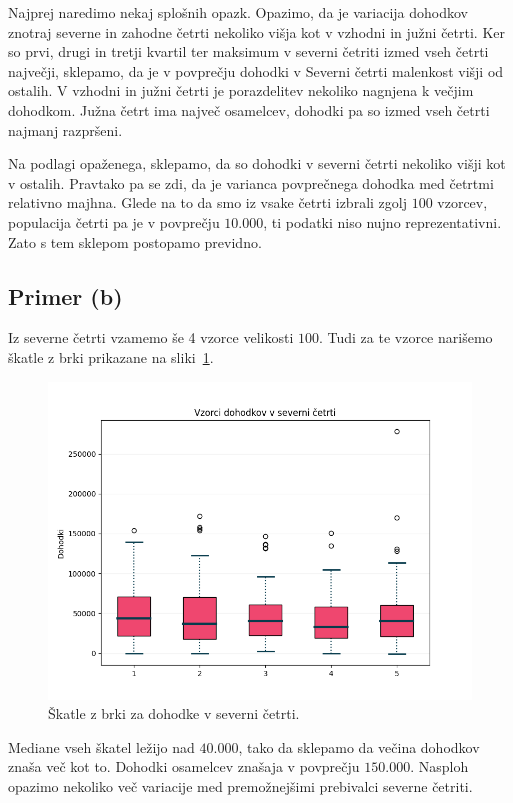 \documentclass[a4paper,11pt]{article}
\begin{document}
Najprej naredimo nekaj splošnih opazk.
Opazimo, da je variacija dohodkov znotraj severne in zahodne četrti nekoliko višja kot v vzhodni in južni četrti. 
Ker so prvi, drugi in tretji kvartil ter maksimum v severni četriti izmed vseh četrti največji, 
sklepamo, da je v povprečju dohodki v Severni četrti malenkost višji od ostalih. 
V vzhodni in južni četrti je porazdelitev nekoliko nagnjena k večjim dohodkom. 
Južna četrt ima največ osamelcev, dohodki pa so izmed vseh četrti najmanj razpršeni.

Na podlagi opaženega, sklepamo, da so dohodki v severni četrti nekoliko višji kot v ostalih.
Pravtako pa se zdi, da je varianca povprečnega dohodka med četrtmi relativno majhna.
Glede na to da smo iz vsake četrti izbrali zgolj $100$ vzorcev, populacija četrti pa je v povprečju $10.000$, ti podatki niso nujno reprezentativni.
Zato s tem sklepom postopamo previdno.

\subsection*{Primer (b)}

Iz severne četrti vzamemo še 4 vzorce velikosti $100$.
Tudi za te vzorce narišemo škatle z brki prikazane na sliki~\ref{brke_sever}.

\begin{figure}[H]
    \centering
    \includegraphics[scale=0.7]{Skatle_z_brki_Sever.png}
    \caption{Škatle z brki za dohodke v severni četrti.}
    \label{brke_sever}
\end{figure}

Mediane vseh škatel ležijo nad $40.000$, tako da sklepamo da večina dohodkov znaša več kot to.
Dohodki osamelcev znašaja v povprečju $150.000$.
Nasploh opazimo nekoliko več variacije med premožnejšimi prebivalci severne četriti.
\end{document}
